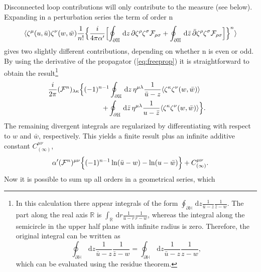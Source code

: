 \documentclass[a4paper,12pt]{article}
\let\bra=\langle        \let\ket=\rangle
\newcommand {\ud} {\mathrm{d}}
\newcommand {\cF} {{\cal F}}
\newcommand {\bbH}{\mathbb{H}}
\newcommand {\bbR}{\mathbb{R}}
\begin{document}
Disconnected loop contributions will only contribute to the measure (see
below).
Expanding in a perturbation series the term of order n 
\begin{equation}
  \label{eq:ninsertion}
\bra\zeta^\mu(u,\bar u)\zeta^\nu(w,\bar w)\frac 1{n!}
                  \Bigl\{\frac i{4\pi\alpha'} 
                  \Bigl[\oint _{\partial\bbH} \, \ud z \,
                  {\partial \zeta^\rho \zeta^\sigma \cF_{\rho\sigma}} +
                  \oint _{\partial\bbH} \, \ud \bar z \,
                  {\bar \partial \zeta^\rho \zeta^\sigma \cF_{\rho\sigma}}
                  \Bigr] \Bigr\}^n \ket
\end{equation}
gives two slightly different contributions, depending on whether n is 
even or odd. By using the derivative of the propagator 
(\ref{eq:freeprop}) it is straightforward to obtain the 
result\footnote{In this calculation there appear integrals of the form
$\oint _{\partial \bbH} \, \ud z \frac1{\bar u - z} \frac1{\bar z - w}$.
The part along the real axis $\bbR$ is 
$\int _\bbR \, \ud r \frac1{\bar u - r} \frac1{r - w}$, whereas the integral
along the semicircle in the upper half plane with infinite radius is zero.
Therefore, the original integral can be written as
\begin{displaymath}  
  \oint _{\partial \bbH} \, \ud z \frac1{\bar u - z} \frac1{\bar z - w} = 
  \oint _{\partial \bbH} \, \ud z \frac1{\bar u - z} \frac1{z - w},
\end{displaymath}
which can be evaluated using the residue theorem.}
\begin{eqnarray}
  \label{eq:ncontribution}
  \frac i{2\pi} (\cF^n)_{\lambda\kappa}
  \Bigl\{(-1)^{n-1} 
  \oint _{\partial \bbH} \,\ud z \, {\eta^{\mu\lambda} \frac1{\bar u-z}
   \bra \zeta^\kappa \zeta^\nu(w,\bar w)\ket} \,\,\, & & \nonumber\\
  + \oint _{\partial \bbH} \,\ud \bar z \,{\eta^{\mu\lambda} \frac1{u-\bar z}
   \bra \zeta^\kappa \zeta^\nu(w, \bar w)\ket}
  \Bigr\} &.&
\end{eqnarray}
The remaining divergent integrals are regularized by differentiating with 
respect to $w$ and $\bar w$, respectively. This yields a finite result plus 
an infinite additive constant $C^{\mu\nu}_{(\infty)}$,
\begin{equation}
  \label{eq:regresult}
  \alpha' (\cF^n)^{\mu\nu} 
  \Bigl\{(-1)^{n-1} \ln(\bar u-w) - \ln(u-\bar w) \Bigr\} + 
  C^{\mu\nu}_{(\infty)}.
\end{equation}
Now it is possible to sum up all orders in a geometrical series, which 
\end{document}
